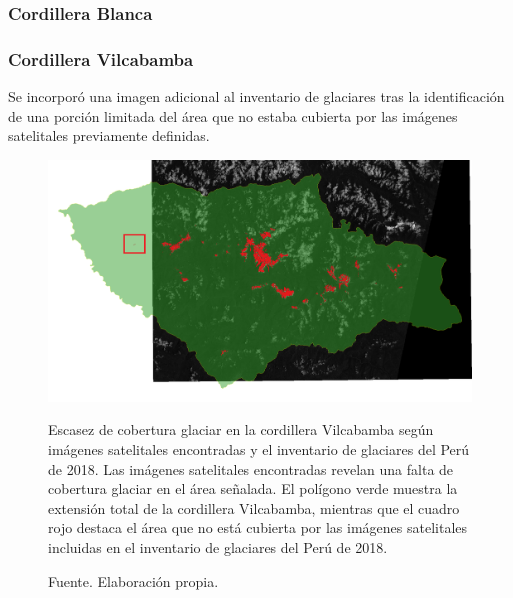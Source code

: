\documentclass[12pt]{report}
\begin{document}
\subsubsection{Cordillera Blanca}

\subsubsection{Cordillera Vilcabamba}

Se incorporó una imagen adicional al inventario de glaciares tras la identificación de una porción limitada del área que no estaba cubierta por las imágenes satelitales previamente definidas.

\begin{figure}[H]
   \centering
   \includegraphics[width=1\textwidth]{Images/imagen_geometria_adicional.png}
   \label{fig:gan1}
   \caption[Escasez de cobertura glaciar en la cordillera Vilcabamba según imágenes satelitales encontradas y el inventario de glaciares del Perú de 2018.]{Escasez de cobertura glaciar en la cordillera Vilcabamba según imágenes satelitales encontradas y el inventario de glaciares del Perú de 2018. Las imágenes satelitales encontradas revelan una falta de cobertura glaciar en el área señalada. El polígono verde muestra la extensión total de la cordillera Vilcabamba, mientras que el cuadro rojo destaca el área que no está cubierta por las imágenes satelitales incluidas en el inventario de glaciares del Perú de 2018.}
   \caption*{Fuente. Elaboración propia.}
\end{figure}
\end{document}
